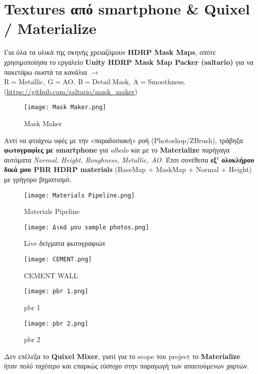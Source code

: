 \section{Textures από smartphone \& Quixel / Materialize}
Για όλα τα υλικά της σκηνής χρειαζόμουν \textbf{HDRP Mask Maps}, οπότε χρησιμοποίησα το εργαλείο \textbf{Unity HDRP Mask Map Packer (saltario)} για να πακετάρω σωστά τα κανάλια \(\rightarrow\) \(\mathrm{R{=}Metallic,\ G{=}AO,\ B{=}Detail\ Mask,\ A{=}Smoothness}\). 
(\href{https://github.com/saltario/mask_maker}{https://github.com/saltario/mask_maker})
\begin{figure}[H]
    \centering
    \texttt{[image: Mask Maker.png]}
    \caption{Mask Maker}
    \label{fig:placeholder}
\end{figure}

Αντί να φτιάχνω υφές με την «παραδοσιακή» ροή (Photoshop/ZBrush), τράβηξα \textbf{φωτογραφίες με smartphone} για \emph{albedo} και με το \textbf{Materialize} παρήγαγα αυτόματα \emph{Normal, Height, Roughness, Metallic, AO}. Έτσι συνέθεσα \textbf{εξ’ ολοκλήρου δικά μου PBR HDRP materials} (BaseMap + MaskMap + Normal + Height) με γρήγορο βηματισμό. 

\begin{figure}[Η]
    \centering
    \texttt{[image: Materials Pipeline.png]}
    \caption{Materials Pipeline}
    \label{fig:placeholder}
\end{figure}

\begin{figure}
    \centering
    \texttt{[image: Δικά μου sample photos.png]}
    \caption{Live δείγματα φωτογραφιών}
    \label{fig:placeholder}
\end{figure}
\begin{figure}[H]
    \centering
    \texttt{[image: CEMENT.png]}
    \caption{CEMENT WALL}
    \label{fig:placeholder}
\end{figure}


\begin{figure}[H]
    \centering
    \texttt{[image: pbr 1.png]}
    \caption{pbr 1}
    \label{fig:placeholder}
\end{figure}

\begin{figure}[H]
    \centering
    \texttt{[image: pbr 2.png]}
    \caption{pbr 2}
    \label{fig:placeholder}
\end{figure}
Δεν επέλεξα το \textbf{Quixel Mixer}, γιατί για το scope του project το \textbf{Materialize} ήταν \emph{πολύ ταχύτερο} και επαρκώς \emph{εύστοχο} στην παραγωγή των απαιτούμενων χαρτών.


